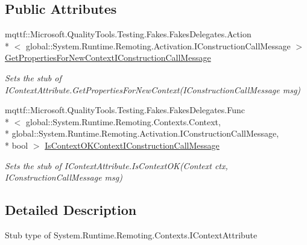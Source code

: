 \subsection*{Public Attributes}
\begin{DoxyCompactItemize}
\item 
mqttf\-::\-Microsoft.\-Quality\-Tools.\-Testing.\-Fakes.\-Fakes\-Delegates.\-Action\\*
$<$ global\-::\-System.\-Runtime.\-Remoting.\-Activation.\-I\-Construction\-Call\-Message $>$ \hyperlink{class_system_1_1_runtime_1_1_remoting_1_1_contexts_1_1_fakes_1_1_stub_i_context_attribute_a9573614f336ab26d9d825389fdd41bbe}{Get\-Properties\-For\-New\-Context\-I\-Construction\-Call\-Message}
\begin{DoxyCompactList}\small\item\em Sets the stub of I\-Context\-Attribute.\-Get\-Properties\-For\-New\-Context(\-I\-Construction\-Call\-Message msg)\end{DoxyCompactList}\item 
mqttf\-::\-Microsoft.\-Quality\-Tools.\-Testing.\-Fakes.\-Fakes\-Delegates.\-Func\\*
$<$ global\-::\-System.\-Runtime.\-Remoting.\-Contexts.\-Context, \\*
global\-::\-System.\-Runtime.\-Remoting.\-Activation.\-I\-Construction\-Call\-Message, \\*
bool $>$ \hyperlink{class_system_1_1_runtime_1_1_remoting_1_1_contexts_1_1_fakes_1_1_stub_i_context_attribute_aa4fbc6dd76d77c5a2588d9c7199bbd35}{Is\-Context\-O\-K\-Context\-I\-Construction\-Call\-Message}
\begin{DoxyCompactList}\small\item\em Sets the stub of I\-Context\-Attribute.\-Is\-Context\-O\-K(\-Context ctx, I\-Construction\-Call\-Message msg)\end{DoxyCompactList}\end{DoxyCompactItemize}


\subsection{Detailed Description}
Stub type of System.\-Runtime.\-Remoting.\-Contexts.\-I\-Context\-Attribute



